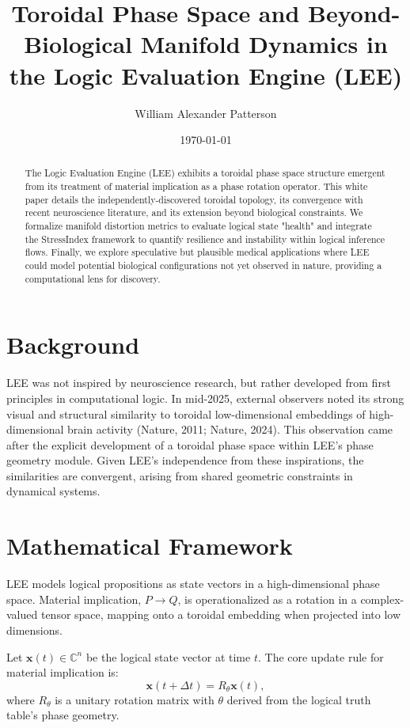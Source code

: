 \documentclass[12pt]{article}
\title{Toroidal Phase Space and Beyond-Biological Manifold Dynamics in the Logic Evaluation Engine (LEE)}
\author{William Alexander Patterson}
\date{\today}
\begin{document}
\maketitle

\begin{abstract}
The Logic Evaluation Engine (LEE) exhibits a toroidal phase space structure emergent from its treatment of material implication as a phase rotation operator. 
This white paper details the independently-discovered toroidal topology, its convergence with recent neuroscience literature, and its extension beyond biological constraints. 
We formalize manifold distortion metrics to evaluate logical state "health" and integrate the StressIndex framework to quantify resilience and instability within logical inference flows. 
Finally, we explore speculative but plausible medical applications where LEE could model potential biological configurations not yet observed in nature, providing a computational lens for discovery.
\end{abstract}

\section{Background}
LEE was not inspired by neuroscience research, but rather developed from first principles in computational logic. 
In mid-2025, external observers noted its strong visual and structural similarity to toroidal low-dimensional embeddings of high-dimensional brain activity (Nature, 2011; Nature, 2024). 
This observation came after the explicit development of a toroidal phase space within LEE's phase geometry module. 
Given LEE's independence from these inspirations, the similarities are convergent, arising from shared geometric constraints in dynamical systems.

\section{Mathematical Framework}
LEE models logical propositions as state vectors in a high-dimensional phase space. 
Material implication, $P \rightarrow Q$, is operationalized as a rotation in a complex-valued tensor space, mapping onto a toroidal embedding when projected into low dimensions.

Let $\mathbf{x}(t) \in \mathbb{C}^n$ be the logical state vector at time $t$. 
The core update rule for material implication is:
\begin{equation}
\mathbf{x}(t + \Delta t) = R_{\theta} \mathbf{x}(t),
\end{equation}
where $R_{\theta}$ is a unitary rotation matrix with $\theta$ derived from the logical truth table's phase geometry.
\end{document}
